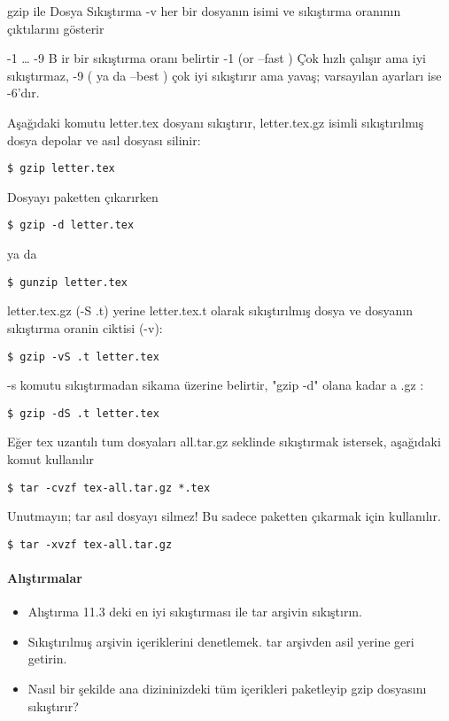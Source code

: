 \begin{section}{gzip ile Dosya Sıkıştırma}
-v her bir dosyanın isimi ve sıkıştırma oranının çıktılarını gösterir

-1 … -9 B ir bir sıkıştırma oranı belirtir -1 (or --fast ) Çok hızlı çalışır ama
iyi sıkıştırmaz, -9 ( ya da --best ) çok iyi sıkıştırır ama yavaş; varsayılan ayarları ise -6'dır.

Aşağıdaki komutu letter.tex dosyanı sıkıştırır, letter.tex.gz isimli sıkıştırılmış dosya depolar ve asıl dosyası silinir:
\begin{verbatim}
$ gzip letter.tex
\end{verbatim}
Dosyayı paketten çıkarırken
\begin{verbatim}
$ gzip -d letter.tex
\end{verbatim}
ya da
\begin{verbatim}
$ gunzip letter.tex
\end{verbatim}
letter.tex.gz (-S .t) yerine letter.tex.t olarak sıkıştırılmış dosya ve dosyanın sıkıştırma oranin ciktisi (-v):
\begin{verbatim}
$ gzip -vS .t letter.tex
\end{verbatim}
-s komutu sıkıştırmadan sikama üzerine belirtir, "gzip -d" olana kadar a .gz :
\begin{verbatim}
$ gzip -dS .t letter.tex
\end{verbatim}
Eğer tex uzantılı tum dosyaları all.tar.gz seklinde sıkıştırmak istersek, aşağıdaki komut kullanılır
\begin{verbatim}
$ tar -cvzf tex-all.tar.gz *.tex
\end{verbatim}
Unutmayın; tar asıl dosyayı silmez! Bu sadece paketten çıkarmak için kullanılır.
\begin{verbatim}
$ tar -xvzf tex-all.tar.gz
\end{verbatim}
\paragraph{Alıştırmalar}{
\begin{itemize}
 \item Alıştırma 11.3 deki en iyi sıkıştırması ile tar arşivin sıkıştırın.
 \item Sıkıştırılmış arşivin içeriklerini denetlemek. tar arşivden asil yerine geri getirin.
 \item Nasıl bir şekilde ana dizininizdeki tüm içerikleri paketleyip gzip dosyasını sıkıştırır?
\end{itemize}}
\end{section}
